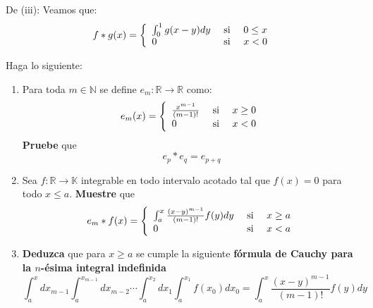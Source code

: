 \documentclass[12pt]{report}
\theoremstyle{largebreak}
\newcommand\cf[3]{\ensuremath{#1:#2\rightarrow#3}}
\begin{document}
\begin{sol}
        De (iii): Veamos que:
        \begin{equation*}
            f*g(x)=\left\{
                \begin{array}{lcr}
                    \int_0^1g(x-y)dy & \textup{ si } & 0\leq x \\
                    0 & \textup{ si } & x<0\\ 
                \end{array}
            \right.
        \end{equation*}
    \end{sol}
    
    \begin{excer}
        Haga lo siguiente:
        \begin{enumerate}
            \item Para toda $m\in\mathbb{N}$ se define $\cf{e_m}{\mathbb{R}}{\mathbb{R}}$ como:
            \begin{equation*}
                e_m(x)=\left\{
                    \begin{array}{lcr}
                        \frac{x^{m-1}}{(m-1)!} & \textup{ si } & x\geq 0 \\
                        0 & \textup{ si }&x<0\\
                    \end{array}
                \right.
            \end{equation*}
            \textbf{Pruebe} que
            \begin{equation*}
                e_p*e_q=e_{p+q}
            \end{equation*}
            \item Sea $\cf{f}{\mathbb{R}}{\mathbb{K}}$ integrable en todo intervalo acotado tal que $f(x)=0$ para todo $x\leq a$. \textbf{Muestre} que
            \begin{equation*}
                e_m*f(x)=\left\{
                    \begin{array}{lcr}
                        \int_{a}^x\frac{(x-y)^{m-1}}{(m-1)!}f(y)dy & \textup{ si } & x\geq a \\
                        0 & \textup{ si }&x<a\\
                    \end{array}
                \right.
            \end{equation*}
            \item \textbf{Deduzca} que para $x\geq a$ se cumple la siguiente \textbf{fórmula de Cauchy para la $n$-ésima integral indefinida}
            \begin{equation*}
                \int_{a}^xdx_{ m-1}\int_a^{ x_{m-1}}dx_{m-2}\cdots\int_{a}^{x_{2}} dx_{1}\int_a^{ x_1}f(x_0)dx_0=\int_a^x\frac{(x-y)^{m-1}}{(m-1)!}f(y)dy
            \end{equation*}
        \end{enumerate}
    \end{excer}
\end{document}
